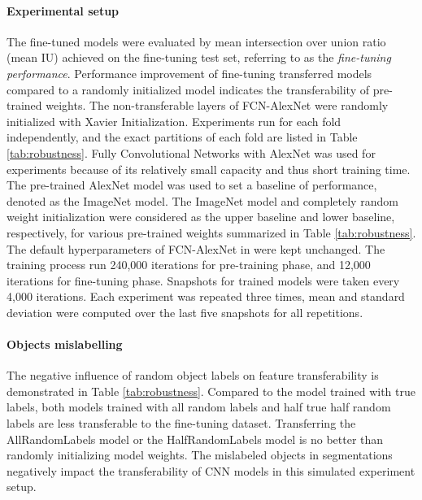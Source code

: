 \paragraph{Experimental setup}
The fine-tuned models were evaluated by mean intersection over union ratio (mean IU) achieved on the fine-tuning test set, referring to as the \textit{fine-tuning performance}.
Performance improvement of fine-tuning transferred models compared to a randomly initialized model indicates the transferability of pre-trained weights.
The non-transferable layers of FCN-AlexNet were randomly initialized with Xavier Initialization.
Experiments run for each fold independently, and the exact partitions of each fold are listed in Table \ref{tab:robustness}.
Fully Convolutional Networks with AlexNet was used for experiments because of its relatively small capacity and thus short training time.
The pre-trained AlexNet model was used to set a baseline of performance, denoted as the ImageNet model.
The ImageNet model and completely random weight initialization were considered as the upper baseline and lower baseline, respectively, for various pre-trained weights summarized in Table \ref{tab:robustness}.
The default hyperparameters of FCN-AlexNet in  \cite{long2015fully} were kept unchanged.
The training process run 240,000 iterations for pre-training phase, and 12,000 iterations for fine-tuning phase.
Snapshots for trained models were taken every 4,000 iterations.
Each experiment was repeated three times, mean and standard deviation were computed over the last five snapshots for all repetitions.



\paragraph{Objects mislabelling}
The negative influence of random object labels on feature transferability is demonstrated in Table \ref{tab:robustness}.
Compared to the model trained with true labels, both models trained with all random labels and half true half random labels are less transferable to the fine-tuning dataset.
Transferring the AllRandomLabels model or the HalfRandomLabels model is no better than randomly initializing model weights.
The mislabeled objects in segmentations negatively impact the transferability of CNN models in this simulated experiment setup.

